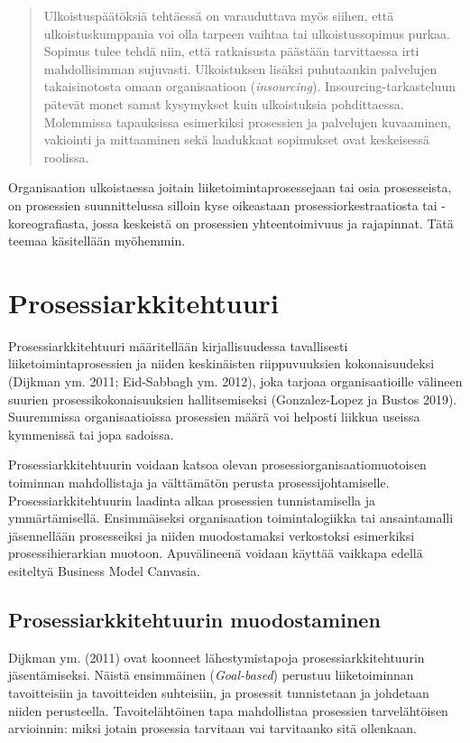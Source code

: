 \documentclass[
  finnish,
  letterpaper,
  DIV=11,
  numbers=noendperiod,
  oneside]{scrreprt}
\begin{document}
\begin{quote}
Ulkoistuspäätöksiä tehtäessä on varauduttava myös siihen, että
ulkoistuskumppania voi olla tarpeen vaihtaa tai ulkoistussopimus purkaa.
Sopimus tulee tehdä niin, että ratkaisusta päästään tarvittaessa irti
mahdollisimman sujuvasti. Ulkoistuksen lisäksi puhutaankin palvelujen
takaisinotosta omaan organisaatioon (\emph{insourcing}).
Insourcing-tarkasteluun pätevät monet samat kysymykset kuin ulkoistuksia
pohdittaessa. Molemmissa tapauksissa esimerkiksi prosessien ja
palvelujen kuvaaminen, vakiointi ja mittaaminen sekä laadukkaat
sopimukset ovat keskeisessä roolissa.
\end{quote}

Organisaation ulkoistaessa joitain liiketoimintaprosessejaan tai osia
prosesseista, on prosessien suunnittelussa silloin kyse oikeastaan
prosessiorkestraatiosta tai -koreografiasta, jossa keskeistä on
prosessien yhteentoimivuus ja rajapinnat. Tätä teemaa käsitellään
myöhemmin.


\chapter{Prosessiarkkitehtuuri}\label{prosessiarkkitehtuuri}

Prosessiarkkitehtuuri määritellään kirjallisuudessa tavallisesti
liiketoimintaprosessien ja niiden keskinäisten riippuvuuksien
kokonaisuudeksi (Dijkman ym. 2011; Eid-Sabbagh ym. 2012), joka tarjoaa
organisaatioille välineen suurien prosessikokonaisuuksien
hallitsemiseksi (Gonzalez-Lopez ja Bustos 2019). Suuremmissa
organisaatioissa prosessien määrä voi helposti liikkua useissa
kymmenissä tai jopa sadoissa.

Prosessiarkkitehtuurin voidaan katsoa olevan
prosessiorganisaatiomuotoisen toiminnan mahdollistaja ja välttämätön
perusta prosessijohtamiselle. Prosessiarkkitehtuurin laadinta alkaa
prosessien tunnistamisella ja ymmärtämisellä. Ensimmäiseksi
organisaation toimintalogiikka tai ansaintamalli jäsennellään
prosesseiksi ja niiden muodostamaksi verkostoksi esimerkiksi
prosessihierarkian muotoon. Apuvälineenä voidaan käyttää vaikkapa edellä
esiteltyä Business Model Canvasia.

\section{Prosessiarkkitehtuurin
muodostaminen}\label{prosessiarkkitehtuurin-muodostaminen}

Dijkman ym. (2011) ovat koonneet lähestymistapoja prosessiarkkitehtuurin
jäsentämiseksi. Näistä ensimmäinen (\emph{Goal-based}) perustuu
liiketoiminnan tavoitteisiin ja tavoitteiden suhteisiin, ja prosessit
tunnistetaan ja johdetaan niiden perusteella. Tavoitelähtöinen tapa
mahdollistaa prosessien tarvelähtöisen arvioinnin: miksi jotain
prosessia tarvitaan vai tarvitaanko sitä ollenkaan.
\end{document}
